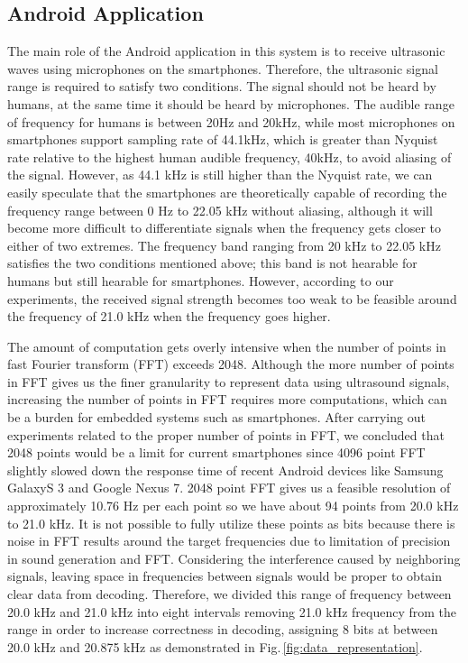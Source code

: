 \subsection{Android Application}
\label{sec:android-application}

The main role of the Android application in this system is to receive ultrasonic waves using microphones on the smartphones. Therefore, the ultrasonic signal range is required to satisfy two conditions. The signal should not be heard by humans, at the same time it should be heard by microphones. The audible range of frequency for humans is between 20Hz and 20kHz, while most microphones on smartphones support sampling rate of 44.1kHz, which is greater than Nyquist rate relative to the highest human audible frequency, 40kHz, to avoid aliasing of the signal. However, as 44.1 kHz is still higher than the Nyquist rate, we can easily speculate that the smartphones are theoretically capable of recording the frequency range between 0 Hz to 22.05 kHz without aliasing, although it will become more difficult to differentiate signals when the frequency gets closer to either of two extremes. The frequency band ranging from 20 kHz to 22.05 kHz satisfies the two conditions mentioned above; this band is not hearable for humans but still hearable for smartphones. However, according to our experiments, the received signal strength becomes too weak to be feasible around the frequency of 21.0 kHz when the frequency goes higher.

The amount of computation gets overly intensive when the number of points in fast Fourier transform (FFT) exceeds 2048. Although the more number of points in FFT gives us the finer granularity to represent data using ultrasound signals, increasing the number of points in FFT requires more computations, which can be a burden for embedded systems such as smartphones. After carrying out experiments related to the proper number of points in FFT, we concluded that 2048 points would be a limit for current smartphones since 4096 point FFT slightly slowed down the response time of recent Android devices like Samsung GalaxyS 3 and Google Nexus 7. 2048 point FFT gives us a feasible resolution of approximately 10.76 Hz per each point so we have about 94 points from 20.0 kHz to 21.0 kHz. It is not possible to fully utilize these points as bits because there is noise in FFT results around the target frequencies due to limitation of precision in sound generation and FFT. Considering the interference caused by neighboring signals, leaving space in frequencies between signals would be proper to obtain clear data from decoding. Therefore, we divided this range of frequency between 20.0 kHz and 21.0 kHz into eight intervals removing 21.0 kHz frequency from the range in order to increase correctness in decoding, assigning 8 bits at between 20.0 kHz and 20.875 kHz as demonstrated in Fig.\,\ref{fig:data_representation}.

